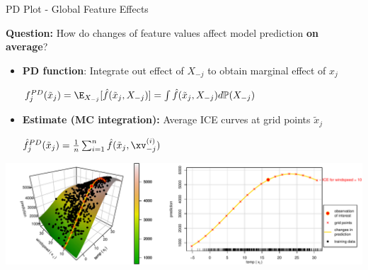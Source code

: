 \documentclass[11pt,compress,t,notes=noshow, aspectratio=169, xcolor=table,dvipsnames]{beamer}
\begin{document}
\begin{frame}{PD Plot - Global Feature Effects}

\textbf{Question:} How do changes of feature values affect model prediction \textbf{on average}?


\begin{itemize}
    \item \textbf{PD function}: Integrate out effect of $X_{-j}$ to obtain marginal effect of $x_j$
    
    \medskip
    
    \centerline{$ \textstyle
    f_j^{PD}(\tilde x_j) = \E_{X_{-j}}[\hat f(\tilde x_j, X_{-j})] = \int \hat f(\tilde x_j, X_{-j}) d \mathbb{P}(X_{-j})
    $}

    \smallskip
    
    \item \textbf{Estimate (MC integration):} Average ICE curves at grid points $\tilde x_j$
    
    \medskip
    
    \centerline{$ \textstyle
    \hat f_j^{PD}(\tilde x_j) = \frac{1}{n} \sum_{i=1}^{n} \hat f(\tilde x_j, \xv_{-j}^{(i)})
    $}
\end{itemize}


\vfill
\centering
\includegraphics[width=\textwidth, page = 2]{figure/ice_motivation_bike}

\end{frame}
\end{document}
